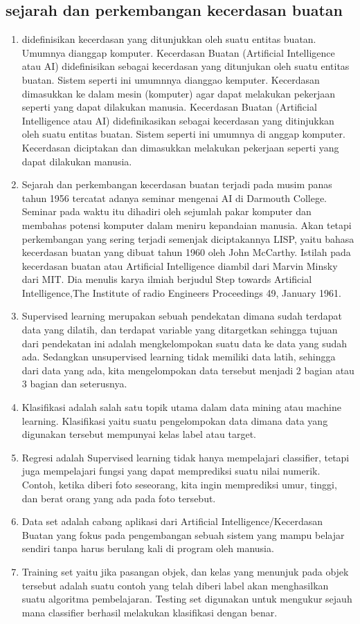 \subsection{sejarah dan perkembangan kecerdasan buatan}
\begin{enumerate}
\item didefinisikan  kecerdasan yang ditunjukkan oleh suatu entitas buatan. Umumnya dianggap komputer. Kecerdasan Buatan (Artificial Intelligence atau AI) didefinisikan sebagai kecerdasan yang ditunjukan oleh suatu entitas buatan. Sistem seperti ini umumnnya dianggao kemputer. Kecerdasan dimasukkan ke dalam mesin (komputer) agar dapat melakukan pekerjaan seperti yang dapat dilakukan manusia. Kecerdasan Buatan (Artificial Intelligence atau AI) didefinikasikan sebagai kecerdasan yang ditinjukkan oleh suatu entitas buatan. Sistem seperti ini umumnya di anggap komputer. Kecerdasan diciptakan dan dimasukkan melakukan pekerjaan seperti yang dapat dilakukan manusia. 
\item Sejarah dan perkembangan kecerdasan buatan terjadi pada musim panas tahun 1956 tercatat adanya seminar mengenai AI di Darmouth College. Seminar pada waktu itu dihadiri oleh sejumlah pakar komputer dan membahas potensi komputer dalam meniru 
kepandaian manusia. Akan tetapi perkembangan yang sering terjadi semenjak diciptakannya LISP, yaitu bahasa kecerdasan buatan yang dibuat tahun 1960 oleh John McCarthy. Istilah pada kecerdasan buatan atau Artificial Intelligence diambil dari Marvin Minsky dari MIT. Dia menulis karya ilmiah berjudul Step towards Artificial Intelligence,The Institute of radio Engineers Proceedings 49, January 1961\cite{ai2011kecerdasani}.
\item Supervised learning merupakan sebuah pendekatan dimana sudah terdapat data yang dilatih, dan terdapat variable yang ditargetkan sehingga tujuan dari pendekatan ini adalah mengkelompokan suatu data ke data yang sudah ada. Sedangkan unsupervised 
learning tidak memiliki data latih, sehingga dari data yang ada, kita mengelompokan data tersebut menjadi 2 bagian atau 3 bagian dan seterusnya.
\item Klasifikasi adalah salah satu topik utama dalam data mining atau machine learning. Klasifikasi yaitu suatu pengelompokan data dimana data yang digunakan tersebut mempunyai kelas label atau target.
\item Regresi adalah Supervised learning tidak hanya mempelajari classifier, tetapi juga mempelajari fungsi yang dapat memprediksi suatu nilai numerik. Contoh, ketika diberi foto seseorang, kita ingin memprediksi umur, tinggi, dan berat orang yang ada pada foto tersebut.
\item Data set adalah cabang aplikasi dari Artificial Intelligence/Kecerdasan Buatan yang fokus pada pengembangan sebuah sistem yang mampu belajar sendiri tanpa harus berulang kali di program oleh manusia.
\item Training set yaitu jika pasangan objek, dan kelas yang menunjuk pada objek tersebut adalah suatu contoh yang telah diberi label akan menghasilkan suatu algoritma pembelajaran.
\subitem Testing set digunakan untuk mengukur sejauh mana classifier berhasil melakukan klasifikasi dengan benar\cite{darujati2012pemanfaatan}.




\end{enumerate}

